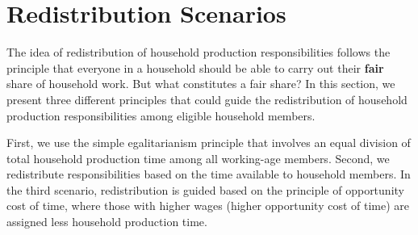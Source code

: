 \documentclass[
  11pt,
]{article}
\begin{document}
\begin{table}

\caption{\label{tbl-stat}Summary Statisitcs Population}


\end{table}%

\section{Redistribution Scenarios}\label{redistribution-scenarios}

The idea of redistribution of household production responsibilities
follows the principle that everyone in a household should be able to
carry out their \textbf{fair} share of household work. But what
constitutes a fair share? In this section, we present three different
principles that could guide the redistribution of household production
responsibilities among eligible household members.

First, we use the simple egalitarianism principle that involves an equal
division of total household production time among all working-age
members. Second, we redistribute responsibilities based on the time
available to household members. In the third scenario, redistribution is
guided based on the principle of opportunity cost of time, where those
with higher wages (higher opportunity cost of time) are assigned less
household production time.
\end{document}
